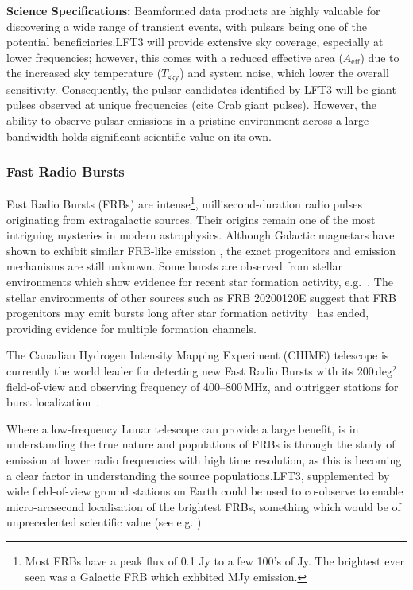 \textbf{Science Specifications:} Beamformed data products are highly valuable for discovering a wide range of transient events, with pulsars being one of the potential beneficiaries.LFT3 will provide extensive sky coverage, especially at lower frequencies; however, this comes with a reduced effective area (\(A_{\text{eff}}\)) due to the increased sky temperature (\(T_{\text{sky}}\)) and system noise, which lower the overall sensitivity. Consequently, the pulsar candidates identified by LFT3 will be giant pulses observed at unique frequencies (cite Crab giant pulses). However, the ability to observe pulsar emissions in a pristine environment across a large bandwidth holds significant scientific value on its own. 



\subsubsection{Fast Radio Bursts}
Fast Radio Bursts (FRBs) are intense\footnote{Most FRBs have a peak flux of 0.1 Jy to a few 100's of Jy. The brightest ever seen was a Galactic FRB which exhbited MJy emission.}, millisecond-duration radio pulses originating from extragalactic sources. Their origins remain one of the most intriguing mysteries in modern astrophysics. Although Galactic magnetars have shown to exhibit similar FRB-like emission \citep{BC_2020,chime2020sgr1935}, the exact progenitors and emission mechanisms are still unknown. Some bursts are observed from stellar environments which show evidence for recent star formation activity, e.g.~\citet{piro2021}. The stellar environments of other sources such as FRB 20200120E suggest that FRB progenitors may emit bursts long after star formation activity~\citep{kirsten2022m81} has ended, providing evidence for multiple formation channels.

The Canadian Hydrogen Intensity Mapping Experiment (CHIME) telescope is currently the world leader for detecting new Fast Radio Bursts with its 200\,deg$^{2}$ field-of-view and observing frequency of 400--800\,MHz, and outrigger stations for burst localization~\citep{leung2021synoptic,lanman2024kko}. 

Where a low-frequency Lunar telescope can provide a large benefit, is in understanding the true nature and populations of FRBs is through the study of emission at lower radio frequencies with high time resolution, as this is becoming a clear factor in understanding the source populations.LFT3, supplemented by wide field-of-view ground stations on Earth could be used to co-observe to enable micro-arcsecond localisation of the brightest FRBs, something which would be of unprecedented scientific value (see e.g. \cite{nimmo_burst_2023}). 

